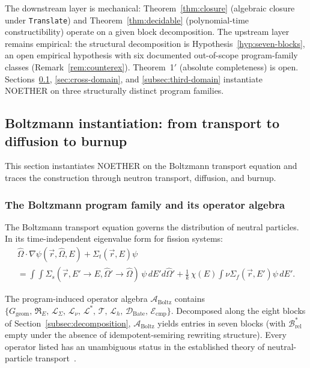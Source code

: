 \documentclass[manuscript]{acmart}
\begin{document}
The downstream layer is mechanical: Theorem~\ref{thm:closure} (algebraic closure under \texttt{Translate}) and Theorem~\ref{thm:decidable} (polynomial-time constructibility) operate on a given block decomposition. The upstream layer remains empirical: the structural decomposition is Hypothesis~\ref{hyp:seven-blocks}, an open empirical hypothesis with six documented out-of-scope program-family classes (Remark~\ref{rem:counterex}). Theorem~1$'$ (absolute completeness) is open. Sections~\ref{sec:reactor}, \ref{sec:cross-domain}, and \ref{subsec:third-domain} instantiate NOETHER on three structurally distinct program families.



\subsection{Boltzmann instantiation: from transport to diffusion to burnup}
\label{sec:reactor}

This section instantiates NOETHER on the Boltzmann transport equation and traces the construction through neutron transport, diffusion, and burnup.

\subsubsection{The Boltzmann program family and its operator algebra}

The Boltzmann transport equation governs the distribution of neutral particles. In its time-independent eigenvalue form for fission systems:
\begin{multline}
\hat{\Omega}\!\cdot\!\nabla\psi(\vec{r},\hat{\Omega},E) + \Sigma_t(\vec{r},E)\psi \\
= \int\!\!\int \Sigma_s(\vec{r}, E'\!\to\!E,\hat{\Omega}'\!\to\!\hat{\Omega})\,\psi\,dE'd\hat{\Omega}'
+ \tfrac{1}{k}\,\chi(E)\!\!\int\!\nu\Sigma_f(\vec{r},E')\psi\,dE'.
\end{multline}

The program-induced operator algebra $\mathcal{A}_{\mathrm{Boltz}}$ contains $\{G_{\mathrm{geom}},\, \mathfrak{R}_E,\, \mathcal{L}_{\Sigma},\, \mathcal{L}_\nu,\, \mathcal{L}^*,\, \mathcal{T},\, \mathcal{L}_h,\, \mathcal{D}_{\mathrm{Bate}},\, \mathcal{E}_{\mathrm{cmp}}\}$. Decomposed along the eight blocks of Section~\ref{subsec:decomposition}, $\mathcal{A}_{\mathrm{Boltz}}$ yields entries in seven blocks (with $\mathcal{B}^{*}_{\mathrm{rel}}$ empty under the absence of idempotent-semiring rewriting structure). Every operator listed has an unambiguous status in the established theory of neutral-particle transport~\cite{BellGlasstone1970, LewisMiller1993}.
\end{document}

